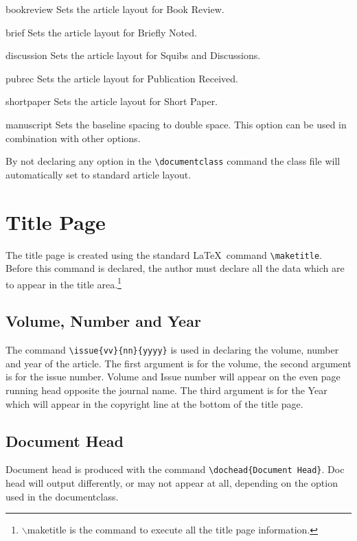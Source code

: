 \documentclass{clv3}
\begin{document}
\begin{deflist}
\item[bookreview] Sets the article layout for Book Review.
\item[brief] Sets the article layout for Briefly Noted.
\item[discussion] Sets the article layout for Squibs and Discussions.
\item[pubrec] Sets the article layout for Publication Received.
\item[shortpaper] Sets the article layout for Short Paper.
\item[manuscript] Sets the baseline spacing to double space. This 
option can be used in combination with other options.
\end{deflist}

By not declaring any option in the \verb|\documentclass| command the class file
will automatically set to standard article layout.

\section{Title Page}

The title page is created using the standard \LaTeX\ command \verb|\maketitle|. 
Before this command is declared, the author must declare all the data which are 
to appear in the title area.\footnote{$\backslash$maketitle is the command to execute all the title page information.}

\subsection{Volume, Number and Year}

The command \verb|\issue{vv}{nn}{yyyy}| is used in declaring the volume, number
and year of the article. The first argument is for the volume, the second argument 
is for the issue number. Volume and Issue number will appear on the even page 
running head opposite the journal name. The third argument is for the Year which 
will appear in the copyright line at the bottom of the title page.

\subsection{Document Head}

Document head is produced with the command \verb|\dochead{Document Head}|. Doc head 
will output differently, or may not appear at all, depending on the option used in the 
documentclass.
\end{document}
